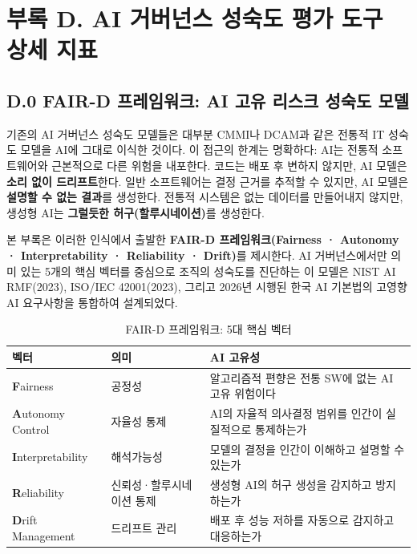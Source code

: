 \chapter*{부록 D. AI 거버넌스 성숙도 평가 도구 상세 지표}
\label{ch:appendix_d}

\section*{D.0 FAIR-D 프레임워크: AI 고유 리스크 성숙도 모델}

기존의 AI 거버넌스 성숙도 모델들은 대부분 CMMI나 DCAM과 같은 전통적 IT 성숙도 모델을 AI에 그대로 이식한 것이다. 이 접근의 한계는 명확하다: AI는 전통적 소프트웨어와 근본적으로 다른 위험을 내포한다. 코드는 배포 후 변하지 않지만, AI 모델은 \textbf{소리 없이 드리프트}한다. 일반 소프트웨어는 결정 근거를 추적할 수 있지만, AI 모델은 \textbf{설명할 수 없는 결과}를 생성한다. 전통적 시스템은 없는 데이터를 만들어내지 않지만, 생성형 AI는 \textbf{그럴듯한 허구(할루시네이션)}를 생성한다.

본 부록은 이러한 인식에서 출발한 \textbf{FAIR-D 프레임워크(Fairness · Autonomy · Interpretability · Reliability · Drift)}를 제시한다. AI 거버넌스에서만 의미 있는 5개의 핵심 벡터를 중심으로 조직의 성숙도를 진단하는 이 모델은 NIST AI RMF(2023), ISO/IEC 42001(2023), 그리고 2026년 시행된 한국 AI 기본법의 고영향 AI 요구사항을 통합하여 설계되었다.

\begin{table}[htbp]
\centering
\caption{FAIR-D 프레임워크: 5대 핵심 벡터}
\label{tab:faird_vectors}
\begin{tabularx}{\textwidth}{|l|l|X|}
\hline
\textbf{벡터} & \textbf{의미} & \textbf{AI 고유성} \\ \hline
\textbf{F}airness & 공정성 & 알고리즘적 편향은 전통 SW에 없는 AI 고유 위험이다 \\ \hline
\textbf{A}utonomy Control & 자율성 통제 & AI의 자율적 의사결정 범위를 인간이 실질적으로 통제하는가 \\ \hline
\textbf{I}nterpretability & 해석가능성 & 모델의 결정을 인간이 이해하고 설명할 수 있는가 \\ \hline
\textbf{R}eliability & 신뢰성·할루시네이션 통제 & 생성형 AI의 허구 생성을 감지하고 방지하는가 \\ \hline
\textbf{D}rift Management & 드리프트 관리 & 배포 후 성능 저하를 자동으로 감지하고 대응하는가 \\ \hline
\end{tabularx}
\end{table}

